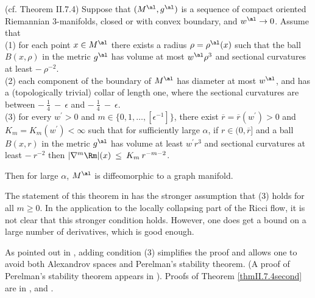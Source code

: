 \begin{theorem}
  \label{thm:kl-thin-part-graph-manifold-existence-thick-thin-geometry-3}
 (cf. Theorem II.7.4) \label{thmII.7.4second}
Suppose that $(M^\al, g^\al)$ is a sequence of compact oriented Riemannian
$3$-manifolds, closed or with convex boundary, and $w^\al \rightarrow 0$.
Assume that \\
(1) for each point $x \in M^\al$ there exists a radius $\rho = \rho^\al(x)$
such that
the ball $B(x, \rho)$ in the metric $g^\al$ has volume at most
$w^\al \rho^3$ and sectional curvatures at least $- \: \rho^{-2}$.\\
(2) each component of the boundary of $M^\al$ has diameter at most
$w^\al$, and has a (topologically trivial) collar of length one, where
the sectional curvatures are between $- \: \frac14 \: - \: \epsilon$ and
$- \: \frac14 \: - \: \epsilon$. \\
(3) for every $w^\prime > 0$ and $m  \in \{0, 1, \ldots, [\epsilon^{-1}]\}$,
there exist $\overline{r} = \overline{r}(w^\prime) > 0$
and $K_m = K_m(w^\prime) <\infty$ such that for sufficiently
large $\alpha$, if $r \in (0, \overline{r}]$
and a ball $B(x,r)$ in the metric $g^\al$
has volume at least $w^\prime r^3$ and sectional curvatures at least
$- \: r^{-2}$ then $|\nabla^m \Rm|(x) \: \le \: K_m \: r^{-m-2}$.

Then for large $\alpha$, $M^\al$ is diffeomorphic to a graph manifold.
\end{theorem}

\begin{remark}
  \label{rem:kl-thin-part-graph-manifold-estimates-noncollapsing}

The statement of this theorem in \cite[Theorem II.7.4]{Perelman2} has the
stronger assumption that (3) holds for all $m \ge 0$. In the
application to the locally collapsing part of the Ricci flow,
it is not clear that this stronger condition holds.  However, one does get
a bound on a large number of derivatives, which is good enough.
\end{remark}

\begin{remark}
  \label{rem:kl-thin-part-graph-manifold-structural-remark-thick-thin-geometry}

As pointed out in \cite[Section 7.4]{Perelman2}, adding condition (3) simplifies
the proof
and allows one to avoid both Alexandrov spaces and Perelman's
stability theorem.
(A proof of Perelman's stability theorem appears in \cite{Kapovitch}).
Proofs of Theorem
\ref{thmII.7.4second} are in \cite{Besson},
\cite{Kleiner-Lott} and \cite{Morgan-Tian2}.
\end{remark}

